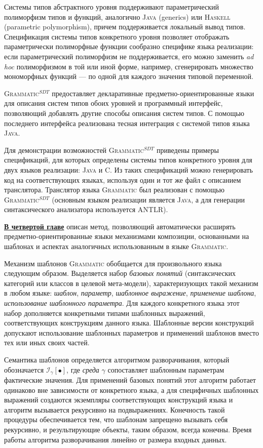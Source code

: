 \documentclass[12pt,a4paper]{article}
\newcommand{\term}[1]{\emph{#1}}
\newcommand{\tool}[1]{\textsc{#1}}
\theoremstyle{definition}
\theoremstyle{plain}
\newcommand{\GRM}{\tool{Grammatic}}
\newcommand{\ATF}{\tool{Grammatic$^{SDT}$}}
\newcommand{\Inst}[2]{\mathcal{I}_{#1} \left[ #2 \right]}%
\newcommand{\afsubsection}[1]{\par \underline{\textbf{#1}}}
\begin{document}
Системы типов абстрактного уровня поддерживают параметрический полиморфизм типов и функций, аналогично \tool{Java} (generics) или \tool{Haskell} (parametric polymorphism), причем поддерживается локальный вывод типов. Спецификация системы типов конкретного уровня позволяет отображать параметрически полиморфные функции сообразно специфике языка реализации: если параметрический полиморфизм не поддерживается, его можно заменить \term{ad hoc} полиморфизмом в той или иной форме, например, сгенерировать множество мономорфных функций --- по одной для каждого значения типовой переменной. 

\ATF{} предоставляет декларативные предметно-ориентированные языки для описания систем типов обоих уровней и программный интерфейс, позволяющий добавлять другие способы описания систем типов. С помощью последнего интерфейса реализована тесная интеграция с системой типов языка \tool{Java}.

Для демонстрации возможностей \ATF{} приведены примеры спецификаций, для которых определены системы типов конкретного уровня для двух языков реализации: \tool{Java} и \tool{C}. Из таких спецификаций можно генерировать код на соответствующих языках, используя один и тот же файл с описанием транслятора. Транслятор языка \GRM{} был реализован с помощью \ATF{} (основным языком реализации является \tool{Java}, а для генерации синтаксического анализатора используется \tool{ANTLR}).

\renewcommand{\thepart}{4}
\afsubsection{В четвертой главе} описан метод, позволяющий автоматически расширять предметно-ориентированные языки механизмами композиции, основанными на шаблонах и аспектах аналогичных использованным в языке \GRM{}. 

Механизм шаблонов \GRM{} обобщается для произвольного языка следующим образом. Выделяется набор \term{базовых понятий} (синтаксических категорий или классов в целевой мета-модели), характеризующих такой механизм в любом языке: \term{шаблон}, \term{параметр}, \term{шаблонное выражение}, \term{применение шаблона}, \term{использование шаблонного параметра}. Для каждого конкретного языка этот набор дополняется конкретными типами шаблонных выражений, соответствующих конструкциям данного языка. Шаблонные версии конструкций допускают использование шаблонных параметров и применений шаблонов вместо тех или иных своих частей. 

Семантика шаблонов определяется алгоритмом разворачивания, который обозначается $\Inst{\gamma}{\bullet}$, где \term{среда} $\gamma$ сопоставляет шаблонным параметрам фактические значения. Для применений базовых понятий этот алгоритм работает одинаково вне зависимости от конкретного языка, а для специфичных шаблонных выражений создаются экземпляры соответствующих конструкций языка и алгоритм вызывается рекурсивно на подвыражениях. Конечность такой процедуры обеспечивается тем, что шаблонам запрещено вызывать себя рекурсивно, и результирующие объекты, таким образом, всегда конечны. Время работы алгоритма разворачивания линейно от размера входных данных.
\end{document}
